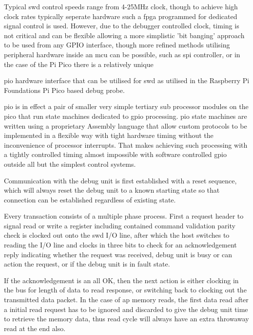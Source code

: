 Typical \gls{swd} control speeds range from 4-25MHz clock, though to achieve high clock rates typically seperate hardware such a \gls{fpga} programmed for dedicated signal control is used. However, due to the debugger controlled clock, timing is not critical and can be flexible allowing a more simplistic 'bit banging' approach to be used from any GPIO interface, though more refined methods utilising peripheral hardware inside an \gls{mcu} can be possible, such as \gls{spi} controller, or in the case of the Pi Pico there is a relatively unique {\gls{pio} hardware interface that can be utilised for \gls{swd} as utilised in the Raspberry Pi Foundations Pi Pico based debug probe.

\gls{pio} is in effect a pair of smaller very simple tertiary sub processor modules on the pico that run state machines dedicated to \gls{gpio} processing. \gls{pio} state machines are written using a proprietary Assembly language that allow custom protocols to be implemented in a flexible way with tight hardware timing without the inconvenience of processor interrupts. That makes achieving such processing with a tightly controlled timing almost impossible with software controlled \gls{gpio} outside all but the simplest control systems.


Communication with the debug unit is first established with a reset sequence, which will always reset the debug unit to a known starting state so that connection can be established regardless of existing state.

Every transaction consists of a multiple phase process. First a request header to signal read or write a register including contained command validation parity check is clocked out onto the \gls{swd} I/O line, after which the host switches to reading the I/O line and clocks in three bits to check for an acknowledgement reply indicating whether the request was received, debug unit is busy or can action the request, or if the debug unit is in fault state.

If the acknowledgement is an all OK, then the next action is either clocking in the bus for length of data to read response, or switching back to clocking out the transmitted data packet. In the case of \gls{ap} memory reads, the first data read after a initial read request has to be ignored and discarded to give the debug unit time to retrieve the memory data, thus read cycle will always have an extra throwaway read at the end also.

}
